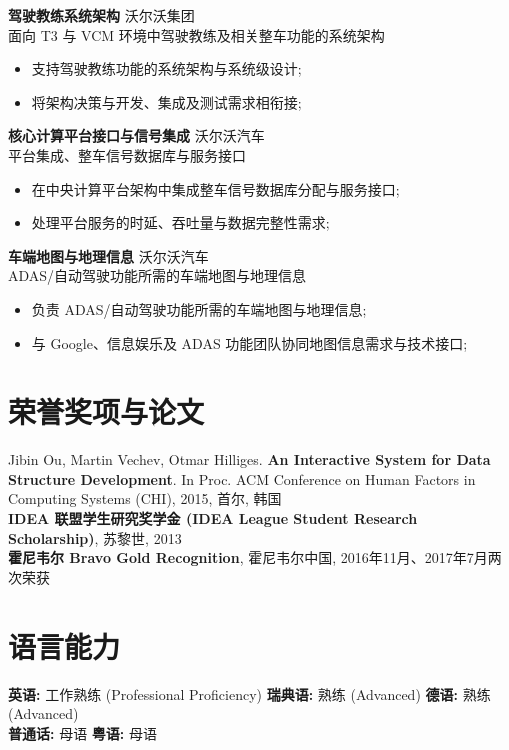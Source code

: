 \documentclass[11pt]{article}
\begin{document}
\vspace{4pt}
\noindent\textbf{驾驶教练系统架构} \hfill 沃尔沃集团\\
面向 T3 与 VCM 环境中驾驶教练及相关整车功能的系统架构
\begin{itemize}
    \item 支持驾驶教练功能的系统架构与系统级设计;
    \item 将架构决策与开发、集成及测试需求相衔接;
\end{itemize}

\vspace{4pt}
\noindent\textbf{核心计算平台接口与信号集成} \hfill 沃尔沃汽车\\
平台集成、整车信号数据库与服务接口
\begin{itemize}
    \item 在中央计算平台架构中集成整车信号数据库分配与服务接口;
    \item 处理平台服务的时延、吞吐量与数据完整性需求;
\end{itemize}

\vspace{4pt}
\noindent\textbf{车端地图与地理信息} \hfill 沃尔沃汽车\\
ADAS/自动驾驶功能所需的车端地图与地理信息
\begin{itemize}
    \item 负责 ADAS/自动驾驶功能所需的车端地图与地理信息;
    \item 与 Google、信息娱乐及 ADAS 功能团队协同地图信息需求与技术接口;
\end{itemize}


\section{荣誉奖项与论文}

\noindent Jibin Ou, Martin Vechev, Otmar Hilliges. \textbf{An Interactive System for Data Structure Development}. In Proc. ACM Conference on Human Factors in Computing Systems (CHI), 2015, 首尔, 韩国\\[2pt]
\textbf{IDEA 联盟学生研究奖学金 (IDEA League Student Research Scholarship)}, 苏黎世, 2013\\
\textbf{霍尼韦尔 Bravo Gold Recognition}, 霍尼韦尔中国, 2016年11月、2017年7月两次荣获


\section{语言能力}

\noindent\textbf{英语:} 工作熟练 (Professional Proficiency) \hfill \textbf{瑞典语:} 熟练 (Advanced) \hfill \textbf{德语:} 熟练 (Advanced)\\
\textbf{普通话:} 母语 \hfill \textbf{粤语:} 母语
\end{document}

